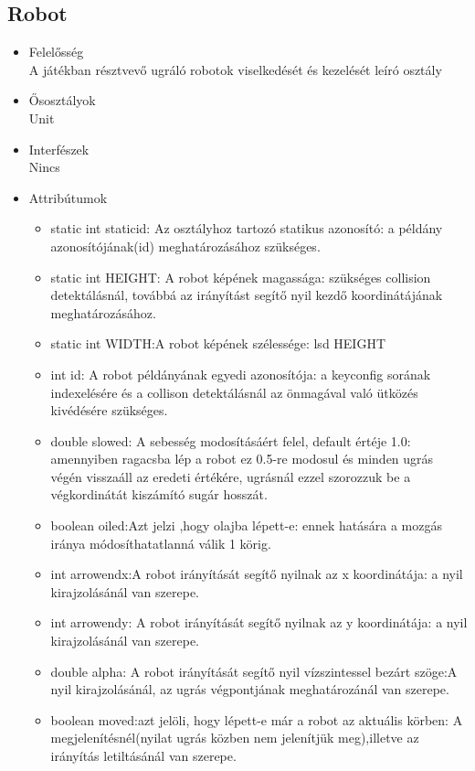 \subsection{Robot}
\begin{itemize}
\item Felelősség\\
A játékban résztvevő ugráló robotok viselkedését és kezelését leíró osztály
\item Ősosztályok\\
Unit
\item Interfészek\\
Nincs
\item Attribútumok\\
	\begin{itemize}
		\item static int staticid: Az osztályhoz tartozó statikus azonosító: a példány                azonosítójának(id) meghatározásához szükséges.
		\item static int HEIGHT: A robot képének magassága: szükséges collision                      detektálásnál, továbbá az irányítást segítő nyil kezdő koordinátájának                  meghatározásához.
		\item static int WIDTH:A robot képének szélessége: lsd HEIGHT
		\item int id: A robot példányának egyedi azonosítója: a keyconfig sorának                     indexelésére és a collison detektálásnál az önmagával való ütközés                      kivédésére szükséges.
		\item double slowed: A sebesség modosításáért felel, default értéje 1.0: amennyiben ragacsba lép a robot ez 0.5-re modosul és minden ugrás végén visszaáll az eredeti értékére, ugrásnál ezzel szorozzuk be a végkordinátát kiszámító sugár hosszát.
		\item boolean oiled:Azt jelzi ,hogy olajba lépett-e: ennek hatására a mozgás iránya módosíthatatlanná válik 1 körig. 
		\item int arrowendx:A robot irányítását segítő nyilnak az x koordinátája: a nyil kirajzolásánál van szerepe.
		\item int arrowendy: A robot irányítását segítő nyilnak az y koordinátája: a nyil kirajzolásánál van szerepe.
		\item double alpha: A robot irányítását segítő nyil vízszintessel bezárt szöge:A nyil kirajzolásánál, az ugrás végpontjának meghatározánál van szerepe.
		\item boolean moved:azt jelöli, hogy lépett-e már a robot az aktuális körben: A megjelenítésnél(nyilat ugrás közben nem jelenítjük meg),illetve az irányítás letiltásánál van szerepe.

\end{itemize}
\end{itemize}
